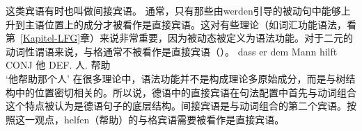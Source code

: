 \zl
这类宾语有时也叫做间接宾语。
通常，只有那些由werden引导的被动句中能够上升到主语位置上的成分才被看作是直接宾语。这对有些理论（如词汇功能语法，看第~\ref{Kapitel-LFG}章）来说非常重要，因为被动态被定义为语法功能。对于二元的动词性谓语来说，与格通常不被看作是直接宾语（\citep{Cook2006a-u}）。
\ea
\gll dass er dem Mann hilft\\
     CONJ 他 DEF.\dat{} 人.\dat{} 帮助\\
\glt `他帮助那个人'
\z
在很多理论中，语法功能并不是构成理论多原始成分，而是与树结构中的位置密切相关的。所以说，德语中的直接宾语在句法配置中首先与动词组合这个特点被认为是德语句子的底层结构。间接宾语是与动词组合的第二个宾语。按照这一观点，helfen（帮助）的与格宾语需要被看作是直接宾语。

